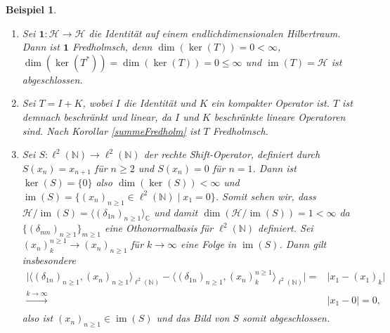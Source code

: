 \documentclass[11pt, hidelinks]{article}
\newcommand{\h}{\mathcal{H}}
\newcommand{\im}{\operatorname{im}}
\numberwithin{conj}{section}
\newtheorem{example}[conj]{Beispiel}
\begin{document}
\begin{example}\noindent
    \begin{enumerate}
        \item Sei $\mathbf{1}: \h \to \h$ die Identität auf einem endlichdimensionalen Hilbertraum. Dann ist $\mathbf{1}$ Fredholmsch, denn $\dim(\ker(T)) = 0 < \infty$, $\dim(\ker(T^\ast)) = \dim(\ker(T)) = 0 \leq \infty$ und $\im(T) = \h$ ist abgeschlossen.
        \item Sei \( T = I + K \), wobei \( I \) die Identität und \( K \) ein kompakter Operator ist. \( T \) ist demnach beschränkt und linear, da \( I \) und \( K \) beschränkte lineare Operatoren sind. Nach Korollar \ref{summeFredholm} ist $T$ Fredholmsch.
        \item Sei $S: \ell^2(\mathbb{N}) \to \ell^2(\mathbb{N})$ der rechte Shift-Operator, definiert durch $S(x_n) = x_{n+1}$ für $n \geq 2$ und $S(x_n) = 0$ für $n=1$. Dann ist $\ker(S) = \{0\}$ also $\dim(\ker(S)) < \infty$ und $\im(S) = \{ (x_n)_{n \geq 1} \in \ell^2(\mathbb{N}) \; \vert \; x_1 = 0\}$. Somit sehen wir, dass $\h/\im(S) = \langle (\delta_{1n})_{n \geq 1} \rangle_{\mathbb{C}}$ und damit $\dim(\h/\im(S)) = 1 < \infty$ da $\{(\delta_{mn})_{n \geq 1}\}_{m \geq 1}$ eine Othonormalbasis für $\ell^2(\mathbb{N})$ definiert. Sei $(x_n)^{n \geq 1}_k \to (x_n)_{n \geq 1}$ für $k \to \infty$ eine Folge in $\im(S)$. Dann gilt insbesondere
        \begin{align}
            \vert \langle (\delta_{1n})_{n \geq 1}, (x_n)_{n \geq 1} \rangle_{\ell^2(\mathbb{N})} - \langle (\delta_{1n})_{n \geq 1}, (x_n)^{n \geq 1}_k \rangle_{\ell^2(\mathbb{N})} \vert = &\vert x_1 - (x_1)_k \vert \nonumber\\
            \xrightarrow[]{k \to \infty} &\vert x_1 - 0 \vert = 0,
        \end{align}
        also ist $(x_n)_{n \geq 1} \in \im(S)$ und das Bild von $S$ somit abgeschlossen.

\end{enumerate}
\end{example}
\end{document}
